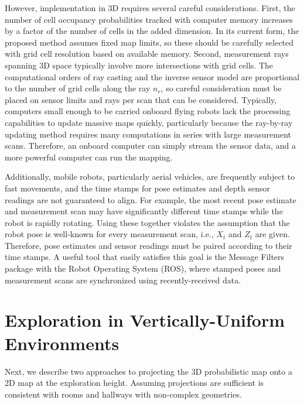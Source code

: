 However, implementation in 3D requires several careful considerations. First, the number of cell occupancy probabilities tracked with computer memory increases by a factor of the number of cells in the added dimension. In its current form, the proposed method assumes fixed map limits, so these should be carefully selected with grid cell resolution based on available memory. Second, measurement rays spanning 3D space typically involve more intersections with grid cells. The computational orders of ray casting and the inverse sensor model are proportional to the number of grid cells along the ray $n_r$, so careful consideration must be placed on sensor limits and rays per scan that can be considered. Typically, computers small enough to be carried onboard flying robots lack the processing capabilities to update massive maps quickly, particularly because the ray-by-ray updating method requires many computations in series with large measurement scans. Therefore, an onboard computer can simply stream the sensor data, and a more powerful computer can run the mapping.

Additionally, mobile robots, particularly aerial vehicles, are frequently subject to fast movements, and the time stamps for pose estimates and depth sensor readings are not guaranteed to align. For example, the most recent pose estimate and measurement scan may have significantly different time stamps while the robot is rapidly rotating. Using these together violates the assumption that the robot pose is well-known for every measurement scan, i.e., $X_t$ and $Z_t$ are given. Therefore, pose estimates and sensor readings must be paired according to their time stamps. A useful tool that easily satisfies this goal is the Message Filters package with the Robot Operating System (ROS), where stamped poses and measurement scans are synchronized using recently-received data.

\section{Exploration in Vertically-Uniform Environments}

Next, we describe two approaches to projecting the 3D probabilistic map onto a 2D map at the exploration height. Assuming projections are sufficient is consistent with rooms and hallways with non-complex geometries.

